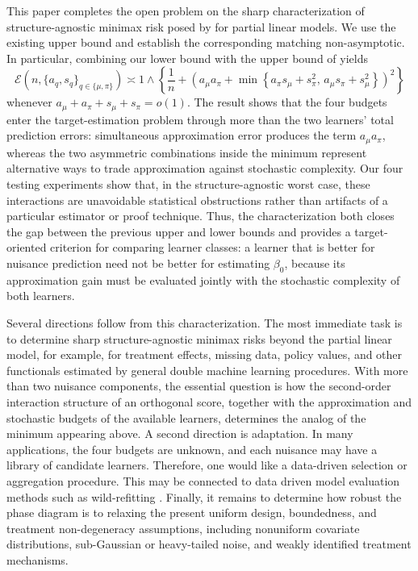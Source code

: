 \documentclass[11pt]{article}
\begin{document}
This paper completes the open problem on the sharp characterization of structure-agnostic minimax risk posed by
\citet{gu2025open} for partial linear models. We use the existing upper bound and establish the corresponding matching non-asymptotic. In
particular, combining our lower bound with the upper bound of
\citet{gu2026optimal} yields
\[
\mathcal E\!\left(n,\{a_q,s_q\}_{q\in\{\mu,\pi\}}\right)
\asymp
1\wedge
\left\{
\frac1n+
\left(
a_\mu a_\pi+
\min\left\{
a_\pi s_\mu+s_\pi^2,\,
a_\mu s_\pi+s_\mu^2
\right\}
\right)^2
\right\}
\]
whenever \(a_\mu+a_\pi+s_\mu+s_\pi=o(1)\). The result shows that the
four budgets enter the target-estimation problem through more than the two
learners' total prediction errors: simultaneous approximation error produces
the term \(a_\mu a_\pi\), whereas the two asymmetric combinations inside the
minimum represent alternative ways to trade approximation against stochastic
complexity. Our four testing experiments show that, in the
structure-agnostic worst case, these interactions are unavoidable statistical
obstructions rather than artifacts of a particular estimator or proof
technique. Thus, the characterization both closes the gap between the
previous upper and lower bounds and provides a target-oriented criterion for
comparing learner classes: a learner that is better for nuisance prediction
need not be better for estimating \(\beta_0\), because its approximation gain
must be evaluated jointly with the stochastic complexity of both learners.

Several directions follow from this characterization. The most immediate task is
to determine sharp structure-agnostic minimax risks beyond the partial linear
model, for example, for treatment effects, missing data, policy values, and other
functionals estimated by general double machine learning procedures. With
more than two nuisance components, the essential question is how the
second-order interaction structure of an orthogonal score, together with the
approximation and stochastic budgets of the available learners, determines
the analog of the minimum appearing above. A second direction is adaptation. In many applications, the four budgets are
unknown, and each nuisance may have a library of candidate learners. Therefore, one 
would like a data-driven selection or aggregation procedure. This may be connected to data driven model evaluation methods such as wild-refitting \citep{wainwright2025wild,hu2025perturbing,hu2026interleaved,ni2026upper}. Finally, it remains to
determine how robust the phase diagram is to relaxing the present
uniform design, boundedness, and treatment non-degeneracy assumptions,
including nonuniform covariate distributions, sub-Gaussian or heavy-tailed
noise, and weakly identified treatment mechanisms.
\end{document}
